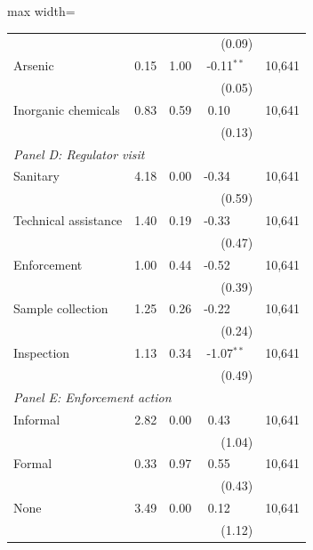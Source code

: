 \begin{table}[htbp]
{\begin{adjustbox}{max width=\linewidth}
\begin{tabular}{p{5cm}rrrr}
 & & & (\phantom{-}0.09)\phantom{$^{***}$} & \\
\quad Arsenic & 0.15 & 1.00 & \phantom{(}-0.11$^{**\phantom{*}}$ & 10,641 \\
 & & & (\phantom{-}0.05)\phantom{$^{***}$} & \\
\quad Inorganic chemicals & 0.83 & 0.59 & \phantom{(}\phantom{-}0.10$^{\phantom{*}\phantom{*}\phantom{*}}$ & 10,641 \\
 & & & (\phantom{-}0.13)\phantom{$^{***}$} & \\
\hline
\multicolumn{5}{l}{\textit{Panel D: Regulator visit}} \\
\quad Sanitary & 4.18 & 0.00 & \phantom{(}-0.34$^{\phantom{*}\phantom{*}\phantom{*}}$ & 10,641 \\
 & & & (\phantom{-}0.59)\phantom{$^{***}$} & \\
\quad Technical assistance & 1.40 & 0.19 & \phantom{(}-0.33$^{\phantom{*}\phantom{*}\phantom{*}}$ & 10,641 \\
 & & & (\phantom{-}0.47)\phantom{$^{***}$} & \\
\quad Enforcement & 1.00 & 0.44 & \phantom{(}-0.52$^{\phantom{*}\phantom{*}\phantom{*}}$ & 10,641 \\
 & & & (\phantom{-}0.39)\phantom{$^{***}$} & \\
\quad Sample collection & 1.25 & 0.26 & \phantom{(}-0.22$^{\phantom{*}\phantom{*}\phantom{*}}$ & 10,641 \\
 & & & (\phantom{-}0.24)\phantom{$^{***}$} & \\
\quad Inspection & 1.13 & 0.34 & \phantom{(}-1.07$^{**\phantom{*}}$ & 10,641 \\
 & & & (\phantom{-}0.49)\phantom{$^{***}$} & \\
\hline
\multicolumn{5}{l}{\textit{Panel E: Enforcement action}} \\
\quad Informal & 2.82 & 0.00 & \phantom{(}\phantom{-}0.43$^{\phantom{*}\phantom{*}\phantom{*}}$ & 10,641 \\
 & & & (\phantom{-}1.04)\phantom{$^{***}$} & \\
\quad Formal & 0.33 & 0.97 & \phantom{(}\phantom{-}0.55$^{\phantom{*}\phantom{*}\phantom{*}}$ & 10,641 \\
 & & & (\phantom{-}0.43)\phantom{$^{***}$} & \\
\quad None & 3.49 & 0.00 & \phantom{(}\phantom{-}0.12$^{\phantom{*}\phantom{*}\phantom{*}}$ & 10,641 \\
 & & & (\phantom{-}1.12)\phantom{$^{***}$} & \\
\bottomrule

\end{tabular}
\end{adjustbox}}
\end{table}
